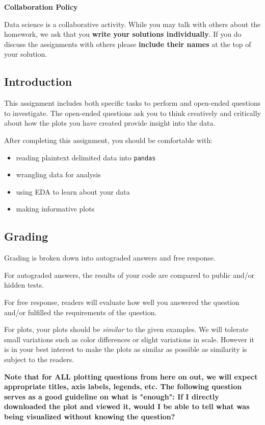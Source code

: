 \documentclass[11pt]{article}
\providecommand{\tightlist}{%
      \setlength{\itemsep}{0pt}\setlength{\parskip}{0pt}}
\begin{document}
\textbf{Collaboration Policy}

Data science is a collaborative activity. While you may talk with others
about the homework, we ask that you \textbf{write your solutions
individually}. If you do discuss the assignments with others please
\textbf{include their names} at the top of your solution.

\subsection{Introduction}\label{introduction}

This assignment includes both specific tasks to perform and open-ended
questions to investigate. The open-ended questions ask you to think
creatively and critically about how the plots you have created provide
insight into the data.

After completing this assignment, you should be comfortable with:

\begin{itemize}
\tightlist
\item
  reading plaintext delimited data into \texttt{pandas}
\item
  wrangling data for analysis
\item
  using EDA to learn about your data
\item
  making informative plots
\end{itemize}

\subsection{Grading}\label{grading}

Grading is broken down into autograded answers and free response.

For autograded answers, the results of your code are compared to public
and/or hidden tests.

For free response, readers will evaluate how well you answered the
question and/or fulfilled the requirements of the question.

For plots, your plots should be \emph{similar} to the given examples. We
will tolerate small variations such as color differences or slight
variations in scale. However it is in your best interest to make the
plots as similar as possible as similarity is subject to the readers.

\textbf{Note that for ALL plotting questions from here on out, we will
expect appropriate titles, axis labels, legends, etc. The following
question serves as a good guideline on what is "enough": If I directly
downloaded the plot and viewed it, would I be able to tell what was
being visualized without knowing the question?}
\end{document}
